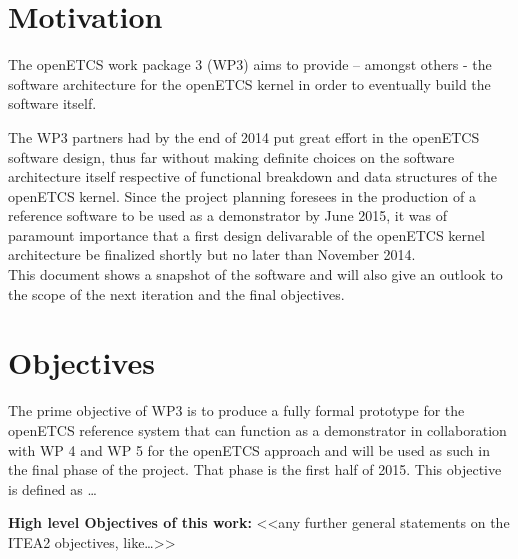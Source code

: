 
%
\section{Motivation}
The openETCS work package 3 (WP3) aims to provide – amongst others - the software architecture for the openETCS kernel in order to eventually build the software itself. 

The WP3  partners had by the end of 2014 put great effort in the openETCS software design, thus far without making definite choices on the software architecture itself respective of functional breakdown and data structures of the openETCS kernel. Since the project planning foresees in the production of a reference software to be used as a demonstrator by June 2015, it was of paramount importance that a first design delivarable of the openETCS kernel architecture be finalized shortly but no later than November 2014.\\

This document shows a snapshot of the software and will also give an outlook to the scope of the next iteration and the final objectives.\\


\section{Objectives}
The prime objective of WP3 is to produce a fully formal prototype for the openETCS reference system that can function as a demonstrator in collaboration with WP 4 and WP 5  for the openETCS approach and will be used as such in the final phase of the project. That phase is the first half of 2015.  This objective is defined as … 

\textbf{High level Objectives of this work:}
<<any further general statements on the ITEA2  objectives, like…>>\\

